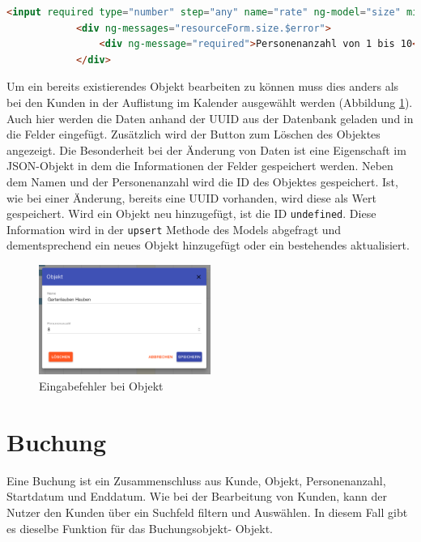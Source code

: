  \begin{lstlisting}[language=HTML, label=code_exampleRegistrationRequest, caption=Beispielhafte Antwort auf eine Registrierungsanfrage]
		<input required type="number" step="any" name="rate" ng-model="size" min="1" max="10"  />
            <div ng-messages="resourceForm.size.$error">
                <div ng-message="required">Personenanzahl von 1 bis 10</div>
            </div>
\end{lstlisting}
 
 

Um ein bereits existierendes Objekt bearbeiten zu können muss dies anders als bei den Kunden in der Auflistung im Kalender ausgewählt
werden (Abbildung \ref{frontend_resource_edit}). Auch hier werden die Daten anhand der UUID aus der Datenbank geladen und in die Felder eingefügt.
Zusätzlich wird der Button zum Löschen des Objektes angezeigt. Die Besonderheit bei der Änderung von Daten ist eine Eigenschaft im JSON-Objekt in dem
die Informationen der Felder gespeichert werden. Neben dem Namen und der Personenanzahl wird die ID des Objektes gespeichert. Ist, wie bei einer Änderung,
bereits eine UUID vorhanden, wird diese als Wert gespeichert. Wird ein Objekt neu hinzugefügt, ist die ID \texttt{undefined}. Diese Information wird in der
\texttt{upsert} Methode des Models abgefragt und dementsprechend ein neues Objekt hinzugefügt oder ein bestehendes aktualisiert.



\begin{figure}[H]
\centering\includegraphics[width=0.5\textwidth]{images/frontend_resource_edit.png}
\caption{Eingabefehler bei Objekt}
\label{frontend_resource_edit}
\end{figure}


  
\section{Buchung}
Eine Buchung ist ein Zusammenschluss aus Kunde, Objekt, Personenanzahl, Startdatum und Enddatum. Wie bei der Bearbeitung von Kunden,
kann der Nutzer den Kunden über ein Suchfeld filtern und Auswählen. In diesem Fall gibt es dieselbe Funktion für das Buchungsobjekt- Objekt.

